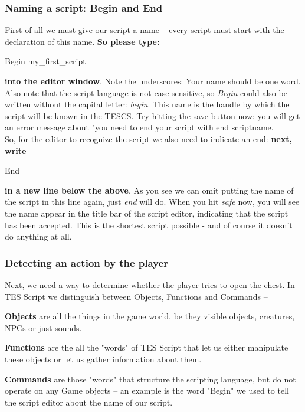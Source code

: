 \documentclass[
]{article}
\begin{document}
\hypertarget{naming-a-script-begin-and-end}{%
\subsubsection{Naming a script: Begin and
End}\label{naming-a-script-begin-and-end}}

First of all we must give our script a name -- every script must start
with the declaration of this name. \textbf{So please type:}

Begin my\_first\_script

\textbf{into the editor window}. Note the underscores: Your name should
be one word. Also note that the script language is not case sensitive,
so \emph{Begin} could also be written without the capital letter:
\emph{begin}. This name is the handle by which the script will be known
in the TESCS. Try hitting the save button now: you will get an error
message about "you need to end your script with end scriptname.\\
So, for the editor to recognize the script we also need to indicate an
end: \textbf{next, write}

End

\textbf{in a new line below the above}. As you see we can omit putting
the name of the script in this line again, just \emph{end} will do. When
you hit \emph{safe} now, you will see the name appear in the title bar
of the script editor, indicating that the script has been accepted. This
is the shortest script possible - and of course it doesn't do anything
at all.

\hypertarget{detecting-an-action-by-the-player}{%
\subsubsection{Detecting an action by the
player}\label{detecting-an-action-by-the-player}}

Next, we need a way to determine whether the player tries to open the
chest. In TES Script we distinguish between Objects, Functions and
Commands --

\textbf{Objects} are all the things in the game world, be they visible
objects, creatures, NPCs or just sounds.

\textbf{Functions} are the all the "words" of TES Script that let us
either manipulate these objects or let us gather information about them.

\textbf{Commands} are those "words" that structure the scripting
language, but do not operate on any Game objects -- an example is the
word "Begin" we used to tell the script editor about the name of our
script.
\end{document}
